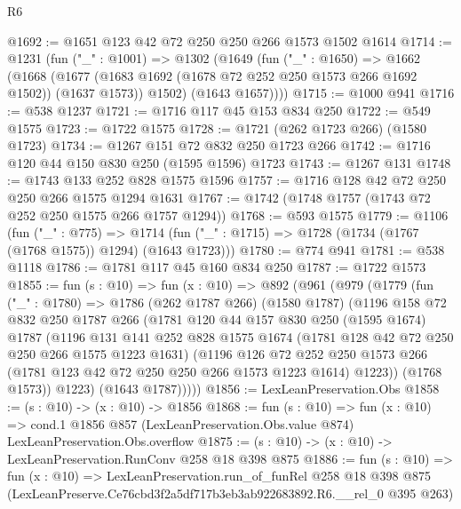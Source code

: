 \begin{lexlean}{R6}
\begin{coremodule}
@1692 := @1651 @123 @42 @72 @250 @250 @266 @1573 @1502 @1614
@1714 := @1231
    (fun ("_" : @1001) =>
    @1302
      (@1649
        (fun ("_" : @1650) =>
        @1662
          (@1668
            (@1677 (@1683 @1692 (@1678 @72 @252 @250 @1573 @266 @1692 @1502)) (@1637 @1573))
            @1502)
          (@1643 @1657))))
@1715 := @1000 @941
@1716 := @538 @1237
@1721 := @1716 @117 @45 @153 @834 @250
@1722 := @549 @1575
@1723 := @1722 @1575
@1728 := @1721 (@262 @1723 @266) (@1580 @1723)
@1734 := @1267 @151 @72 @832 @250 @1723 @266
@1742 := @1716 @120 @44 @150 @830 @250 (@1595 @1596) @1723
@1743 := @1267 @131
@1748 := @1743 @133 @252 @828 @1575 @1596
@1757 := @1716 @128 @42 @72 @250 @250 @266 @1575 @1294 @1631
@1767 := @1742 (@1748 @1757 (@1743 @72 @252 @250 @1575 @266 @1757 @1294))
@1768 := @593 @1575
@1779 := @1106
    (fun ("_" : @775) =>
    @1714 (fun ("_" : @1715) => @1728 (@1734 (@1767 (@1768 @1575)) @1294) (@1643 @1723)))
@1780 := @774 @941
@1781 := @538 @1118
@1786 := @1781 @117 @45 @160 @834 @250
@1787 := @1722 @1573
@1855 := fun (s : @10) =>
  fun (x : @10) =>
  @892
    (@961
      (@979
        (@1779
          (fun ("_" : @1780) =>
          @1786
            (@262 @1787 @266)
            (@1580 @1787)
            (@1196
              @158
              @72
              @832
              @250
              @1787
              @266
              (@1781
                @120
                @44
                @157
                @830
                @250
                (@1595 @1674)
                @1787
                (@1196
                  @131
                  @141
                  @252
                  @828
                  @1575
                  @1674
                  (@1781 @128 @42 @72 @250 @250 @266 @1575 @1223 @1631)
                  (@1196
                    @126
                    @72
                    @252
                    @250
                    @1573
                    @266
                    (@1781 @123 @42 @72 @250 @250 @266 @1573 @1223 @1614)
                    @1223))
                (@1768 @1573))
              @1223)
            (@1643 @1787)))))
@1856 := LexLeanPreservation.Obs
@1858 := (s : @10) -> (x : @10) -> @1856
@1868 := fun (s : @10) =>
  fun (x : @10) =>
  cond.{1} @1856 @857 (LexLeanPreservation.Obs.value @874) LexLeanPreservation.Obs.overflow
@1875 := (s : @10) -> (x : @10) -> LexLeanPreservation.RunConv @258 @18 @398 @875
@1886 := fun (s : @10) =>
  fun (x : @10) =>
  LexLeanPreservation.run_of_funRel
    @258
    @18
    @398
    @875
    (LexLeanPreserve.Ce76cbd3f2a5df717b3eb3ab922683892.R6.__rel_0 @395 @263)
\end{coremodule}
\end{lexlean}
